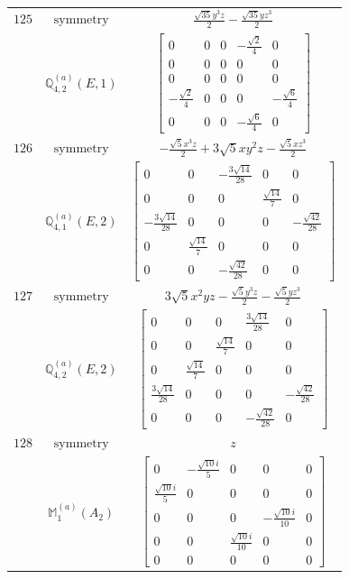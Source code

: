 \documentclass[fleqn,8pt,landscape]{jsarticle}
\begin{document}
\begin{longtable}{ccc}
$ 125 $ & $ \text{symmetry} $ & $ \frac{\sqrt{35} y^{3} z}{2} - \frac{\sqrt{35} y z^{3}}{2} $ \\
$  $ & $ \mathbb{Q}_{4,2}^{(a)}(E,1) $ & $ \begin{bmatrix} 0 & 0 & 0 & - \frac{\sqrt{2}}{4} & 0 \\ 0 & 0 & 0 & 0 & 0 \\ 0 & 0 & 0 & 0 & 0 \\ - \frac{\sqrt{2}}{4} & 0 & 0 & 0 & - \frac{\sqrt{6}}{4} \\ 0 & 0 & 0 & - \frac{\sqrt{6}}{4} & 0 \end{bmatrix} $ \\ \hline
$ 126 $ & $ \text{symmetry} $ & $ - \frac{\sqrt{5} x^{3} z}{2} + 3 \sqrt{5} x y^{2} z - \frac{\sqrt{5} x z^{3}}{2} $ \\
$  $ & $ \mathbb{Q}_{4,1}^{(a)}(E,2) $ & $ \begin{bmatrix} 0 & 0 & - \frac{3 \sqrt{14}}{28} & 0 & 0 \\ 0 & 0 & 0 & \frac{\sqrt{14}}{7} & 0 \\ - \frac{3 \sqrt{14}}{28} & 0 & 0 & 0 & - \frac{\sqrt{42}}{28} \\ 0 & \frac{\sqrt{14}}{7} & 0 & 0 & 0 \\ 0 & 0 & - \frac{\sqrt{42}}{28} & 0 & 0 \end{bmatrix} $ \\ \hline
$ 127 $ & $ \text{symmetry} $ & $ 3 \sqrt{5} x^{2} y z - \frac{\sqrt{5} y^{3} z}{2} - \frac{\sqrt{5} y z^{3}}{2} $ \\
$  $ & $ \mathbb{Q}_{4,2}^{(a)}(E,2) $ & $ \begin{bmatrix} 0 & 0 & 0 & \frac{3 \sqrt{14}}{28} & 0 \\ 0 & 0 & \frac{\sqrt{14}}{7} & 0 & 0 \\ 0 & \frac{\sqrt{14}}{7} & 0 & 0 & 0 \\ \frac{3 \sqrt{14}}{28} & 0 & 0 & 0 & - \frac{\sqrt{42}}{28} \\ 0 & 0 & 0 & - \frac{\sqrt{42}}{28} & 0 \end{bmatrix} $ \\ \hline
$ 128 $ & $ \text{symmetry} $ & $ z $ \\
$  $ & $ \mathbb{M}_{1}^{(a)}(A_{2}) $ & $ \begin{bmatrix} 0 & - \frac{\sqrt{10} i}{5} & 0 & 0 & 0 \\ \frac{\sqrt{10} i}{5} & 0 & 0 & 0 & 0 \\ 0 & 0 & 0 & - \frac{\sqrt{10} i}{10} & 0 \\ 0 & 0 & \frac{\sqrt{10} i}{10} & 0 & 0 \\ 0 & 0 & 0 & 0 & 0 \end{bmatrix} $ \\ \hline

\end{longtable}
\end{document}
